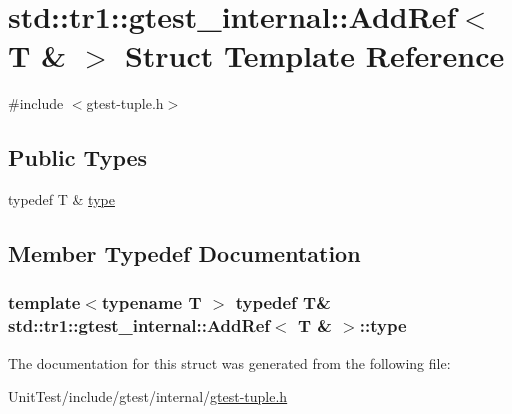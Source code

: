 \hypertarget{structstd_1_1tr1_1_1gtest__internal_1_1_add_ref_3_01_t_01_6_01_4}{\section{std\+:\+:tr1\+:\+:gtest\+\_\+internal\+:\+:Add\+Ref$<$ T \& $>$ Struct Template Reference}
\label{structstd_1_1tr1_1_1gtest__internal_1_1_add_ref_3_01_t_01_6_01_4}
}


{\ttfamily \#include $<$gtest-\/tuple.\+h$>$}

\subsection*{Public Types}
\begin{DoxyCompactItemize}
\item 
typedef T \& \hyperlink{structstd_1_1tr1_1_1gtest__internal_1_1_add_ref_3_01_t_01_6_01_4_a9cb3b0992c2a9e7df42d01fb64c2dc88}{type}
\end{DoxyCompactItemize}


\subsection{Member Typedef Documentation}
\hypertarget{structstd_1_1tr1_1_1gtest__internal_1_1_add_ref_3_01_t_01_6_01_4_a9cb3b0992c2a9e7df42d01fb64c2dc88}{
\subsubsection[{type}]{\setlength{\rightskip}{0pt plus 5cm}template$<$typename T $>$ typedef T\& {\bf std\+::tr1\+::gtest\+\_\+internal\+::\+Add\+Ref}$<$ T \& $>$\+::{\bf type}}}\label{structstd_1_1tr1_1_1gtest__internal_1_1_add_ref_3_01_t_01_6_01_4_a9cb3b0992c2a9e7df42d01fb64c2dc88}


The documentation for this struct was generated from the following file\+:\begin{DoxyCompactItemize}
\item 
Unit\+Test/include/gtest/internal/\hyperlink{gtest-tuple_8h}{gtest-\/tuple.\+h}\end{DoxyCompactItemize}
